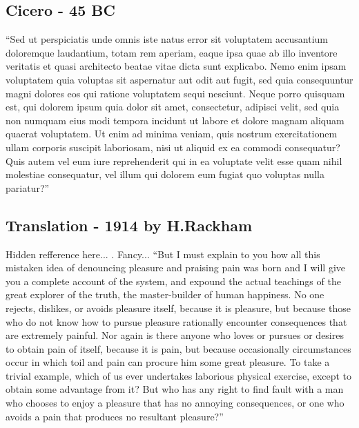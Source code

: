 \documentclass[12pt]{article}
\begin{document}
    \subsection{Cicero - 45 BC}
    ``Sed ut perspiciatis unde omnis iste natus error sit voluptatem accusantium doloremque laudantium, totam rem aperiam, eaque ipsa quae ab illo inventore veritatis et quasi architecto beatae vitae dicta sunt explicabo. Nemo enim ipsam voluptatem quia voluptas sit aspernatur aut odit aut fugit, sed quia consequuntur magni dolores eos qui ratione voluptatem sequi nesciunt. Neque porro quisquam est, qui dolorem ipsum quia dolor sit amet, consectetur, adipisci velit, sed quia non numquam eius modi tempora incidunt ut labore et dolore magnam aliquam quaerat voluptatem. Ut enim ad minima veniam, quis nostrum exercitationem ullam corporis suscipit laboriosam, nisi ut aliquid ex ea commodi consequatur? Quis autem vel eum iure reprehenderit qui in ea voluptate velit esse quam nihil molestiae consequatur, vel illum qui dolorem eum fugiat quo voluptas nulla pariatur?''
    \subsection{Translation - 1914 by H.Rackham}
    Hidden refference here... \citet{Cardelli2009}. Fancy...
    ``But I must explain to you how all this mistaken idea of denouncing pleasure and praising pain was born and I will give you a complete account of the system, and expound the actual teachings of the great explorer of the truth, the master-builder of human happiness. No one rejects, dislikes, or avoids pleasure itself, because it is pleasure, but because those who do not know how to pursue pleasure rationally encounter consequences that are extremely painful. Nor again is there anyone who loves or pursues or desires to obtain pain of itself, because it is pain, but because occasionally circumstances occur in which toil and pain can procure him some great pleasure. To take a trivial example, which of us ever undertakes laborious physical exercise, except to obtain some advantage from it? But who has any right to find fault with a man who chooses to enjoy a pleasure that has no annoying consequences, or one who avoids a pain that produces no resultant pleasure?''
\end{document}
